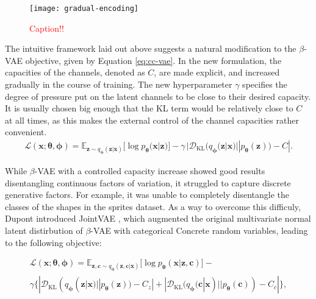 \documentclass{report}
\newcommand\todo[1]{\textcolor{red}{#1}}
\begin{document}
\begin{figure}
\begin{center}
\texttt{[image: gradual-encoding]}
\caption{\todo{Caption!!}}
\label{fig:dsprites-trav}
\end{center}
\end{figure}

\noindent The intuitive framework laid out above suggests a natural modification to the $\beta$-VAE objective, given by Equation \ref{eq:cc-vae}. In the new formulation, the capacities of the channels, denoted as $C$, are made explicit, and increased gradually in the course of training. The new hyperparameter $\gamma$ specifies the degree of pressure put on the latent channels to be close to their desired capacity. It is usually chosen big enough that the KL term would be relatively close to $C$ at all times, as this makes the external control of the channel capacities rather convenient. \\

\begin{equation}
\begin{gathered}
\mathcal{L}(\boldsymbol{x}; \boldsymbol{\theta}, \boldsymbol{\phi}) =
\mathbb{E}_{\boldsymbol{z} \sim q_{\boldsymbol{\phi}}(\boldsymbol{z}|\boldsymbol{x})} \big[ \log p_{\boldsymbol{\theta}} (\boldsymbol{x} | \boldsymbol{z}) \big] - \gamma \, | \mathcal{D}_\text{KL}(q_{\boldsymbol{\phi}}(\boldsymbol{z}|\boldsymbol{x}) || p_{\boldsymbol{\theta}}(\boldsymbol{z})) - C |.
\end{gathered}
\label{eq:cc-vae}
\end{equation} 

\bigskip

\noindent While $\beta$-VAE with a controlled capacity increase showed good results disentangling continuous factors of variation, it struggled to capture discrete generative factors. For example, it was unable to completely disentangle the classes of the shapes in the sprites dataset. As a way to overcome this difficuly, Dupont introduced JointVAE \cite{joint-vae}, which augmented the original multivariate normal latent distirbution of $\beta$-VAE with categorical Concrete random variables, leading to the following objective:

\begin{equation}
\begin{gathered}
\mathcal{L}(\boldsymbol{x}; \boldsymbol{\theta}, \boldsymbol{\phi}) =
\mathbb{E}_{\boldsymbol{z, c} \sim q_{\boldsymbol{\phi}}(\boldsymbol{z, c}|\boldsymbol{x})} \big[ \log p_{\boldsymbol{\theta}} (\boldsymbol{x} | \boldsymbol{z, c}) \big] - \\ \gamma \big\{ | \mathcal{D}_\text{KL}(q_{\boldsymbol{\phi}}(\boldsymbol{z}|\boldsymbol{x}) || p_{\boldsymbol{\theta}}(\boldsymbol{z})) - C_z | + | \mathcal{D}_\text{KL}(q_{\boldsymbol{\phi}}(\boldsymbol{c}|\boldsymbol{x}) || p_{\boldsymbol{\theta}}(\boldsymbol{c})) - C_c | \big\},
\end{gathered}
\end{equation}
\end{document}
